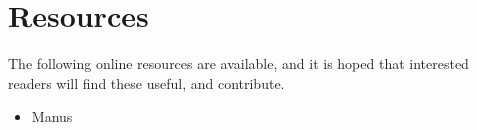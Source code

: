 \section{Resources}

The following online resources are available, and it is hoped that interested readers will find these useful, and contribute.

\begin{itemize}
\item Manus
\end{itemize}